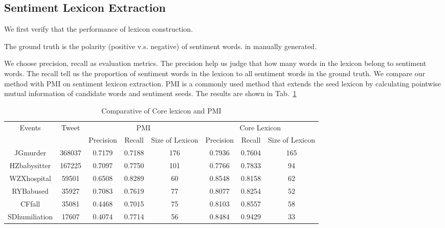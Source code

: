 \documentclass[runningheads]{llncs}
\begin{document}
\subsection{Sentiment Lexicon Extraction}
We first verify that the performance of lexicon construction.

The ground truth is the polarity (positive v.s. negative) of sentiment words.
 in manually generated. %


We choose precision, recall as evaluation metrics. The precision help us judge that how many words in the lexicon belong to sentiment words. The recall tell us the proportion of sentiment words in the lexicon to all sentiment words in the ground truth. We compare our method with PMI on sentiment lexicon extraction. PMI is a commonly used method that extends the seed lexicon by calculating pointwise mutual information of candidate words and sentiment seeds. The results are shown in Tab.~\ref{table:core lexicon}


\begin{table}[ht]
\caption{Comparative  of Core lexicon and PMI}\label{table:core lexicon}
\begin{center}
\begin{tabular}{|c|c|c|c|c|c|c|c|}
\hline
\multirow{2}{*}{Events} & \multirow{2}{*}{Tweet} & \multicolumn{3}{c|}{PMI}             & \multicolumn{3}{c|}{Core Lexicon}    \\ 
\cline{3-8}                         &                        & Precision & Recall & Size of Lexicon & Precision & Recall & Size of Lexicon \\ \hline
JGmurder                & 368037                 & 0.7179    & 0.7188 & 176             & 0.7936    & 0.7604 & 165             \\ \hline
HZbabysitter            & 167225                 & 0.7097    & 0.7750 & 101             & 0.7766    & 0.7833 & 94              \\ \hline
WZXhospital             & 59501                  & 0.6508    & 0.8289 & 60              & 0.8548    & 0.8158 & 62              \\ \hline
RYBabused               & 35927                  & 0.7083    & 0.7619 & 77              & 0.8077    & 0.8254 & 52              \\ \hline
CFfall                  & 35081                  & 0.4468    & 0.7015 & 75              & 0.8103    & 0.8557 & 58              \\ \hline
SDhumiliation           & 17607                  & 0.4074    & 0.7714 & 56              & 0.8484    & 0.9429 & 33              \\ \hline
\end{tabular}
\end{center}
\end{table}
\end{document}
